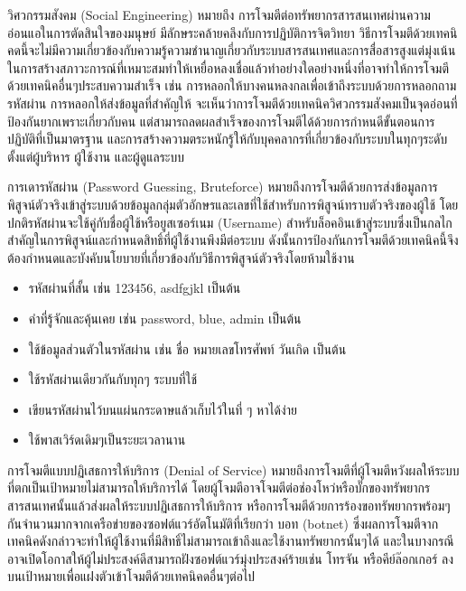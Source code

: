 \documentclass[../th_cyber_warfare_distilled.tex]{subfiles}
\begin{document}
วิศวกรรมสังคม (Social Engineering) หมายถึง การโจมตีต่อทรัพยากรสารสนเทศผ่านความอ่อนแอในการตัดสินใจของมนุษย์ มีลักษระคล้ายคลึงกับการปฏิบัติการจิตวิทยา วิธีการโจมตีด้วยเทคนิคดนี้จะไม่มีความเกี่ยวข้องกับความรู้ความชำนาญเกี่ยวกับระบบสารสนเทศและการสื่อสารสูงแต่มุ่งเน้นในการสร้างสภาวะการณ์ที่เหมาะสมทำให้เหยื่อหลงเชื่อแล้วทำอย่างใดอย่างหนึ่งที่อาจทำให้การโจมตีด้วยเทคนิคอื่นๆประสบความสำเร็จ เช่น การหลอกให้บางคนหลงกลเพื่อเข้าถึงระบบด้วยการหลอกถามรหัสผ่าน การหลอกให้ส่งข้อมูลที่สำคัญให้ จะเห็นว่าการโจมตีด้วยเทคนิควิศวกรรมสังคมเป็นจุดอ่อนที่ป้องกันยากเพราะเกี่ยวกับคน แต่สามารถลดผลสำเร็จของการโจมตีได้ด้วยการกำหนดีขั้นตอนการปฏิบัติที่เป็นมาตรฐาน และการสร้างความตระหนักรู้ให้กับบุคคลากรที่เกี่ยวข้องกับระบบในทุกๆระดับตั้งแต่ผู้บริหาร ผู้ใช้งาน และผู้ดูแลระบบ

การเดารหัสผ่าน (Password Guessing, Bruteforce) หมายถึงการโจมตีด้วยการส่งข้อมูลการพิสูจน์ตัวจริงเข้าสู่ระบบด้วยข้อมูลกลุ่มตัวอักษรและเลขที่ใช้สำหรับการพิสูจน์ทราบตัวจริงของผู้ใช้ โดยปกติรหัสผ่านจะใช้คู่กับชื่อผู้ใช้หรือยูสเซอร์เนม (Username) สำหรับล็อคอินเข้าสู่ระบบซึ่งเป็นกลไกสำคัญในการพิสูจน์และกำหนดสิทธิ์ที่ผู้ใช้งานพึงมีต่อระบบ ดังนั้นการป้องกันการโจมตีด้วยเทคนิคนี้จึงต้องกำหนดและบังคับนโยบายที่เกี่ยวข้องกับวิธีการพิสูจน์ตัวจริงโดยห้ามใช้งาน
\begin{itemize}
	\item รหัสผ่านที่สั้น เช่น 123456, asdfgjkl เป็นต้น
	\item คำที่รู้จักและคุ้นเคย เช่น password, blue, admin เป็นต้น
	\item ใช้ข้อมูลส่วนตัวในรหัสผ่าน เช่น ชื่อ หมายเลขโทรศัพท์ วันเกิด เป็นต้น
	\item ใช้รหัสผ่านเดียวกันกับทุกๆ ระบบที่ใช้
	\item เขียนรหัสผ่านไว้บนแผ่นกระดาษแล้วเก็บไว้ในที่ ๆ หาได้ง่าย
	\item ใช้พาสเวิร์ดเดิมๆเป็นระยะเวลานาน
\end{itemize}


การโจมตีแบบปฏิเสธการให้บริการ (Denial of Service) หมายถึงการโจมตีที่ผู้โจมตีหวังผลให้ระบบที่ตกเป็นเป้าหมายไม่สามารถให้บริการได้ โดยผู้โจมตีอาจโจมตีต่อช่องโหว่หรือบั๊กของทรัพยากรสารสนเทศนั้นแล้วส่งผลให้ระบบปฏิเสธการให้บริการ หรือการโจมตีด้วยการร้องขอทรัพยากรพร้อมๆกันจำนวนมากจากเครือข่ายของซอฟต์แวร์อัตโนมัติที่เรียกว่า บอท (botnet) ซึ่งผลการโจมตีจากเทคนิคดังกล่าวจะทำให้ผู้ใช้งานที่มีสิทธิ์ไม่สามารถเข้าถึงและใช้งานทรัพยากรนั้นๆได้ และในบางกรณีอาจเปิดโอกาสให้ผู้ไม่ประสงค์ดีสามารถฝังซอฟต์แวร์มุ่งประสงค์ร้ายเช่น โทรจัน หรือคีย์ล๊อกเกอร์ ลงบนเป้าหมายเพื่อแฝงตัวเข้าโจมตีด้วยเทคนิคดอื่นๆต่อไป
\end{document}
